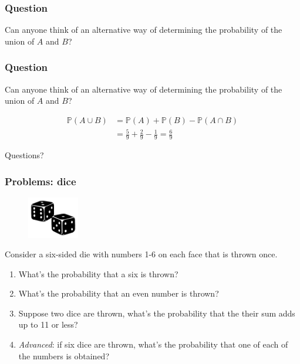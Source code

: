 \documentclass{beamer}
\begin{document}
	\begin{frame}
		\frametitle{Question}
		
		\Large Can anyone think of an alternative way of determining the probability of the union of $A$ and $B$?
		
	\end{frame}

	\begin{frame}
		\frametitle{Question}
		
		\Large Can anyone think of an alternative way of determining the probability of the union of $A$ and $B$?
		
		\begin{align}
			\mathbb{P}(A \cup B) &= \mathbb{P}(A) + \mathbb{P}(B) - \mathbb{P}(A \cap B)\\
			&= \frac{5}{9} + \frac{2}{9} - \frac{1}{9} = \frac{6}{9}
		\end{align}
		
		
	\end{frame}
	
	
	\begin{frame}
		\Large Questions?
	\end{frame}
	
	
	\begin{frame}
		\frametitle{Problems: dice}
		
		\begin{figure}[ht]
			\centerline{\includegraphics[width=0.2\textwidth]{./figures/dice.png}}
		\end{figure}
	
	Consider a six-sided die with numbers 1-6 on each face that is thrown once.
		
		\begin{enumerate}
			\item What's the probability that a six is thrown?
			\item What's the probability that an even number is thrown?
			\item Suppose two dice are thrown, what's the probability that the their sum adds up to 11 or less?
			\item \textit{Advanced}: if six dice are thrown, what's the probability that one of each of the numbers is obtained?
		\end{enumerate}
		
	\end{frame}
\end{document}
